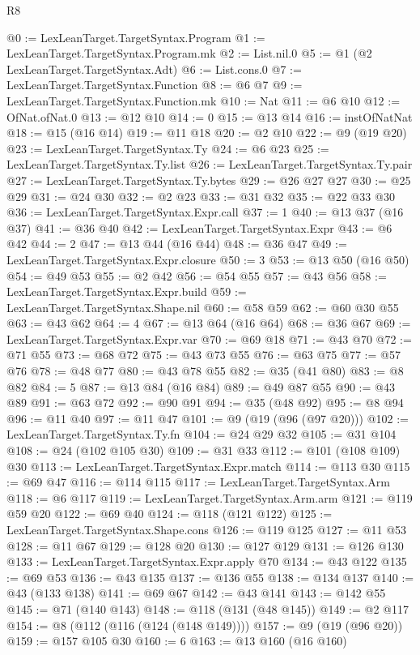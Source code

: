 \begin{lexlean}{R8}
\begin{coremodule}
@0 := LexLeanTarget.TargetSyntax.Program
@1 := LexLeanTarget.TargetSyntax.Program.mk
@2 := List.nil.{0}
@5 := @1 (@2 LexLeanTarget.TargetSyntax.Adt)
@6 := List.cons.{0}
@7 := LexLeanTarget.TargetSyntax.Function
@8 := @6 @7
@9 := LexLeanTarget.TargetSyntax.Function.mk
@10 := Nat
@11 := @6 @10
@12 := OfNat.ofNat.{0}
@13 := @12 @10
@14 := 0
@15 := @13 @14
@16 := instOfNatNat
@18 := @15 (@16 @14)
@19 := @11 @18
@20 := @2 @10
@22 := @9 (@19 @20)
@23 := LexLeanTarget.TargetSyntax.Ty
@24 := @6 @23
@25 := LexLeanTarget.TargetSyntax.Ty.list
@26 := LexLeanTarget.TargetSyntax.Ty.pair
@27 := LexLeanTarget.TargetSyntax.Ty.bytes
@29 := @26 @27 @27
@30 := @25 @29
@31 := @24 @30
@32 := @2 @23
@33 := @31 @32
@35 := @22 @33 @30
@36 := LexLeanTarget.TargetSyntax.Expr.call
@37 := 1
@40 := @13 @37 (@16 @37)
@41 := @36 @40
@42 := LexLeanTarget.TargetSyntax.Expr
@43 := @6 @42
@44 := 2
@47 := @13 @44 (@16 @44)
@48 := @36 @47
@49 := LexLeanTarget.TargetSyntax.Expr.closure
@50 := 3
@53 := @13 @50 (@16 @50)
@54 := @49 @53
@55 := @2 @42
@56 := @54 @55
@57 := @43 @56
@58 := LexLeanTarget.TargetSyntax.Expr.build
@59 := LexLeanTarget.TargetSyntax.Shape.nil
@60 := @58 @59
@62 := @60 @30 @55
@63 := @43 @62
@64 := 4
@67 := @13 @64 (@16 @64)
@68 := @36 @67
@69 := LexLeanTarget.TargetSyntax.Expr.var
@70 := @69 @18
@71 := @43 @70
@72 := @71 @55
@73 := @68 @72
@75 := @43 @73 @55
@76 := @63 @75
@77 := @57 @76
@78 := @48 @77
@80 := @43 @78 @55
@82 := @35 (@41 @80)
@83 := @8 @82
@84 := 5
@87 := @13 @84 (@16 @84)
@89 := @49 @87 @55
@90 := @43 @89
@91 := @63 @72
@92 := @90 @91
@94 := @35 (@48 @92)
@95 := @8 @94
@96 := @11 @40
@97 := @11 @47
@101 := @9 (@19 (@96 (@97 @20)))
@102 := LexLeanTarget.TargetSyntax.Ty.fn
@104 := @24 @29 @32
@105 := @31 @104
@108 := @24 (@102 @105 @30)
@109 := @31 @33
@112 := @101 (@108 @109) @30
@113 := LexLeanTarget.TargetSyntax.Expr.match
@114 := @113 @30
@115 := @69 @47
@116 := @114 @115
@117 := LexLeanTarget.TargetSyntax.Arm
@118 := @6 @117
@119 := LexLeanTarget.TargetSyntax.Arm.arm
@121 := @119 @59 @20
@122 := @69 @40
@124 := @118 (@121 @122)
@125 := LexLeanTarget.TargetSyntax.Shape.cons
@126 := @119 @125
@127 := @11 @53
@128 := @11 @67
@129 := @128 @20
@130 := @127 @129
@131 := @126 @130
@133 := LexLeanTarget.TargetSyntax.Expr.apply @70
@134 := @43 @122
@135 := @69 @53
@136 := @43 @135
@137 := @136 @55
@138 := @134 @137
@140 := @43 (@133 @138)
@141 := @69 @67
@142 := @43 @141
@143 := @142 @55
@145 := @71 (@140 @143)
@148 := @118 (@131 (@48 @145))
@149 := @2 @117
@154 := @8 (@112 (@116 (@124 (@148 @149))))
@157 := @9 (@19 (@96 @20))
@159 := @157 @105 @30
@160 := 6
@163 := @13 @160 (@16 @160)

\end{coremodule}
\end{lexlean}
